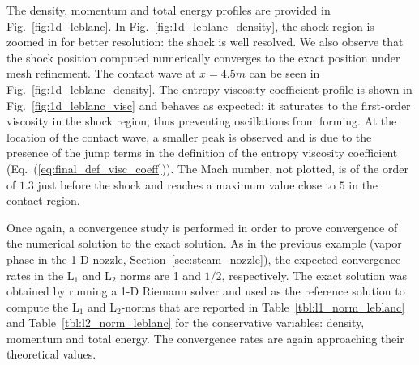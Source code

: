 \documentclass[preprint,10pt]{elsarticle}
\newcommand{\eqt}[1]{Eq.~(\ref{#1})}                     %
\newcommand{\fig}[1]{Fig.~\ref{#1}}                      %
\newcommand{\tbl}[1]{Table~\ref{#1}}                     %
\newcommand{\sct}[1]{Section~\ref{#1}}                   %
\begin{document}
%
The density, momentum and total energy profiles are provided in \fig{fig:1d_leblanc}. In \fig{fig:1d_leblanc_density}, 
the shock region is zoomed in for better resolution: the shock is well resolved. We also observe that the shock 
position computed numerically converges to the exact position under mesh refinement. The contact wave at $x=4.5m$ 
can be seen in \fig{fig:1d_leblanc_density}. The entropy viscosity coefficient profile is shown in 
\fig{fig:1d_leblanc_visc} and behaves as expected: it saturates to the first-order viscosity in the 
shock region, thus preventing oscillations from forming. At the location of the contact wave, a 
smaller peak is observed and is due to the presence of the jump terms in the definition of the entropy 
viscosity coefficient (\eqt{eq:final_def_visc_coeff}).  The Mach number, not plotted, is of the order 
of $1.3$ just before the shock and reaches a maximum value close to $5$ in the contact region.

Once again, a convergence study is performed in order to prove convergence of the numerical solution to 
the exact solution. As in the previous example (vapor phase in the 1-D nozzle, \sct{sec:steam_nozzle}), 
the expected convergence rates in the L$_1$ and L$_2$ norms are 1 and $1/2$, respectively. The exact 
solution was obtained by running a 1-D Riemann solver and used as the reference solution to compute 
the L$_1$ and L$_2$-norms that are reported in \tbl{tbl:l1_norm_leblanc} and \tbl{tbl:l2_norm_leblanc} 
for the conservative variables: density, momentum and total energy. The convergence rates are again approaching their theoretical values.
\end{document}
